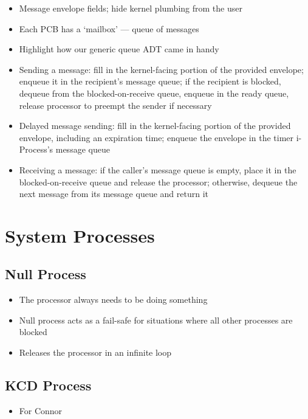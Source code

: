 \documentclass[12pt]{report}
\begin{document}
\begin{itemize}
    \item Message envelope fields; hide kernel plumbing from the user
    \item Each PCB has a `mailbox' --- queue of messages
    \item Highlight how our generic queue ADT came in handy
    \item Sending a message: fill in the kernel-facing portion of the provided envelope; enqueue it in the recipient's message queue; if the recipient is blocked, dequeue from the blocked-on-receive queue, enqueue in the ready queue, release processor to preempt the sender if necessary
    \item Delayed message sending: fill in the kernel-facing portion of the provided envelope, including an expiration time; enqueue the envelope in the timer i-Process's message queue
    \item Receiving a message: if the caller's message queue is empty, place it in the blocked-on-receive queue and release the processor; otherwise, dequeue the next message from its message queue and return it
\end{itemize}

\section{System Processes}

\subsection{Null Process}

\begin{itemize}
    \item The processor always needs to be doing something
    \item Null process acts as a fail-safe for situations where all other processes are blocked
    \item Releases the processor in an infinite loop
\end{itemize}

\subsection{KCD Process}

\begin{itemize}
    \item For Connor
\end{itemize}
\end{document}
